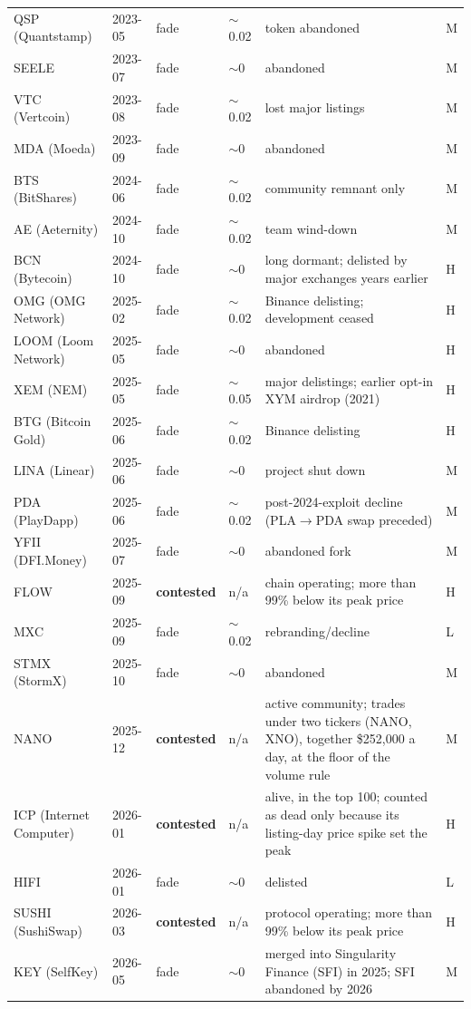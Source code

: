 \documentclass[11pt]{article}
\begin{document}
\begin{center}
\begin{longtable}{llll>{\raggedright\arraybackslash}p{5.4cm}l}
QSP (Quantstamp) & 2023-05 & fade & $\sim$0.02 & token abandoned & M \\
SEELE & 2023-07 & fade & $\sim$0 & abandoned & M \\
VTC (Vertcoin) & 2023-08 & fade & $\sim$0.02 & lost major listings & M \\
MDA (Moeda) & 2023-09 & fade & $\sim$0 & abandoned & M \\
BTS (BitShares) & 2024-06 & fade & $\sim$0.02 & community remnant only & M \\
AE (Aeternity) & 2024-10 & fade & $\sim$0.02 & team wind-down & M \\
BCN (Bytecoin) & 2024-10 & fade & $\sim$0 & long dormant; delisted by major exchanges years earlier & H \\
OMG (OMG Network) & 2025-02 & fade & $\sim$0.02 & Binance delisting; development ceased & H \\
LOOM (Loom Network) & 2025-05 & fade & $\sim$0 & abandoned & H \\
XEM (NEM) & 2025-05 & fade & $\sim$0.05 & major delistings; earlier opt-in XYM airdrop (2021) & H \\
BTG (Bitcoin Gold) & 2025-06 & fade & $\sim$0.02 & Binance delisting & H \\
LINA (Linear) & 2025-06 & fade & $\sim$0 & project shut down & M \\
PDA (PlayDapp) & 2025-06 & fade & $\sim$0.02 & post-2024-exploit decline (PLA$\to$PDA swap preceded) & M \\
YFII (DFI.Money) & 2025-07 & fade & $\sim$0 & abandoned fork & M \\
FLOW & 2025-09 & \textbf{contested} & n/a & chain operating; more than 99\% below its peak price & H \\
MXC & 2025-09 & fade & $\sim$0.02 & rebranding/decline & L \\
STMX (StormX) & 2025-10 & fade & $\sim$0 & abandoned & M \\
NANO & 2025-12 & \textbf{contested} & n/a & active community; trades under two tickers (NANO, XNO), together \$252,000 a day, at the floor of the volume rule & M \\
ICP (Internet Computer) & 2026-01 & \textbf{contested} & n/a & alive, in the top 100; counted as dead only because its listing-day price spike set the peak & H \\
HIFI & 2026-01 & fade & $\sim$0 & delisted & L \\
SUSHI (SushiSwap) & 2026-03 & \textbf{contested} & n/a & protocol operating; more than 99\% below its peak price & H \\
KEY (SelfKey) & 2026-05 & fade & $\sim$0 & merged into Singularity Finance (SFI) in 2025; SFI abandoned by 2026 & M \\
\bottomrule
\end{longtable}
\end{center}
\end{document}
